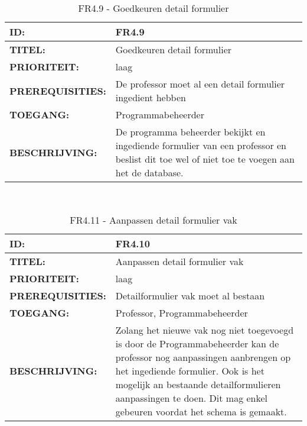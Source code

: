 \noindent\begin{table}[H]
            \begin{tabular}{l | p{10cm}}
                \textbf{ID:} & FR4.9 \\ \hline
                \textbf{TITEL:} & Goedkeuren detail formulier   \\ \hline
                \textbf{PRIORITEIT:} &  laag \\ \hline
                \textbf{PREREQUISITIES:} & De professor moet al een detail formulier ingedient hebben\\ \hline
                \textbf{TOEGANG:} & Programmabeheerder \\ \hline
                \textbf{BESCHRIJVING:} & De programma beheerder bekijkt en ingediende formulier van een professor en beslist dit toe wel of niet toe te voegen aan het de database. 
            \end{tabular}\\
            \caption{FR4.9 - Goedkeuren detail formulier  }
            \label{tab:FR4.9 - Goedkeuren detail formulier  }
        \end{table}
        
\noindent\begin{table}[H]
            \begin{tabular}{l | p{10cm}}
                \textbf{ID:} & FR4.10 \\ \hline
                \textbf{TITEL:} & Aanpassen detail formulier vak \\ \hline
                \textbf{PRIORITEIT:} &  laag \\ \hline
                \textbf{PREREQUISITIES:} & Detailformulier vak moet al bestaan\\ \hline
                \textbf{TOEGANG:} & Professor, Programmabeheerder \\ \hline
                \textbf{BESCHRIJVING:} & Zolang het nieuwe vak nog niet toegevoegd is door de Programmabeheerder kan de professor nog aanpassingen aanbrengen op het ingediende formulier. Ook is het mogelijk an bestaande detailformulieren aanpassingen te doen. Dit mag enkel gebeuren voordat het schema is gemaakt.\\ 
            \end{tabular}\\
            \caption{FR4.11 - Aanpassen detail formulier vak}
            \label{tab:FR4.11 - Aanpassen detail formulier vak}
        \end{table}


